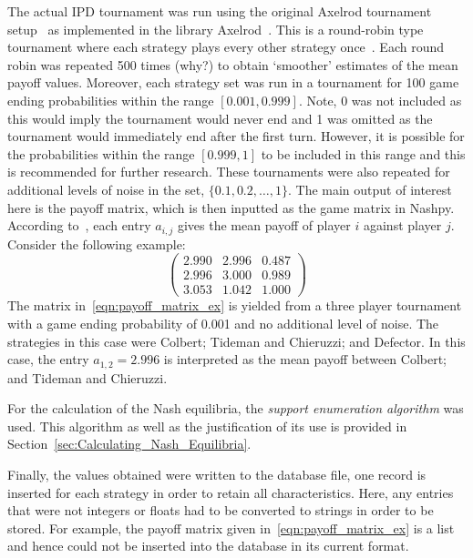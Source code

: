 The actual IPD tournament was run using the original Axelrod tournament
setup~\cite{adeoye2012application} as implemented in the library
Axelrod~\cite{axelrodproject}. This is a round-robin type tournament where each
strategy plays every other strategy once~\cite{axelrod1980effective}.
Each round robin was repeated 500 times (why?) to obtain `smoother' estimates of
the mean payoff values. Moreover, each strategy set was run in a tournament for
100 game ending probabilities within the range \([0.001, 0.999]\). Note, 0 was
not included as this would imply the tournament would never end and 1 was
omitted as the tournament would immediately end after the first turn. However,
it is possible for the probabilities within the range \([0.999, 1]\) to be
included in this range and this is recommended for
further research. These tournaments were also repeated for additional levels of
noise in the set, \( \{0.1, 0.2, \ldots, 1\} \). The main output of interest
here is the payoff matrix, which is then inputted as the game matrix in Nashpy.
According to~\cite{axelrodproject}, each entry \(a_{i,j}\) gives the mean payoff
of player \(i\) against player \(j\). Consider the following example:
\begin{equation}
    \begin{pmatrix}
        2.990 &   2.996  &   0.487\\  
        2.996 &   3.000  &   0.989\\
        3.053 &   1.042  &   1.000        
    \end{pmatrix}
\end{equation}\label{eqn:payoff_matrix_ex}
The matrix in~\ref{eqn:payoff_matrix_ex} is yielded from a three player
tournament with a game ending probability of 0.001 and no additional level of
noise. The strategies in this case were Colbert; Tideman and Chieruzzi; and
Defector. In this case, the entry \(a_{1,2} = 2.996\) is interpreted as the
mean payoff between Colbert; and Tideman and Chieruzzi. 

For the calculation of the Nash equilibria, the \textit{support enumeration
algorithm} was used. This algorithm as well as the justification of its use is
provided in Section~\ref{sec:Calculating_Nash_Equilibria}.

Finally, the values obtained were written to the database file, one record is
inserted for each strategy in order to retain all characteristics. Here, any
entries that were not integers or floats had to be converted to strings in order
to be stored. For example, the payoff matrix given
in~\ref{eqn:payoff_matrix_ex} is a list and hence could not be inserted into the
database in its current format.


